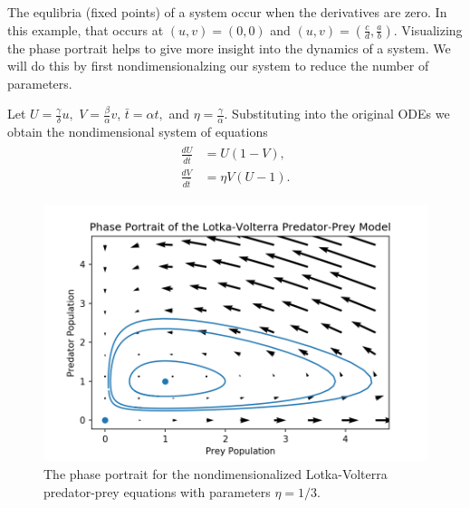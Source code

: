 The equlibria (fixed points) of a system occur when the derivatives are zero.
In this example, that occurs at $(u,v)=(0,0)$ and $(u,v)=(\frac{c}{d},\frac{a}{b})$.
Visualizing the phase portrait helps to give more insight into the dynamics of a system. We will do this by first nondimensionalzing our system to reduce the number of parameters.

Let $U = \frac{\gamma}{\delta}u,$ $V = \frac{\beta}{\alpha}v$, $\bar{t} = \alpha t,$ and $\eta = \frac{\gamma}{\alpha}$.
Substituting into the original ODEs we obtain the nondimensional system of equations
\begin{align}
	\begin{split}
	\frac{dU}{d\bar{t}} &= U(1-V),\\
	\frac{dV}{d\bar{t}} &= \eta V (U-1).
	\end{split}\label{lotka_volterra}
\end{align}
\begin{figure}
\centering
\includegraphics[width=\textwidth]{figures/LV_Phase_Portrait.png}
\caption{The phase portrait for the nondimensionalized Lotka-Volterra predator-prey equations with parameters $\eta = 1/3$.
 }
\label{fig: lotka-phase}
\end{figure}


